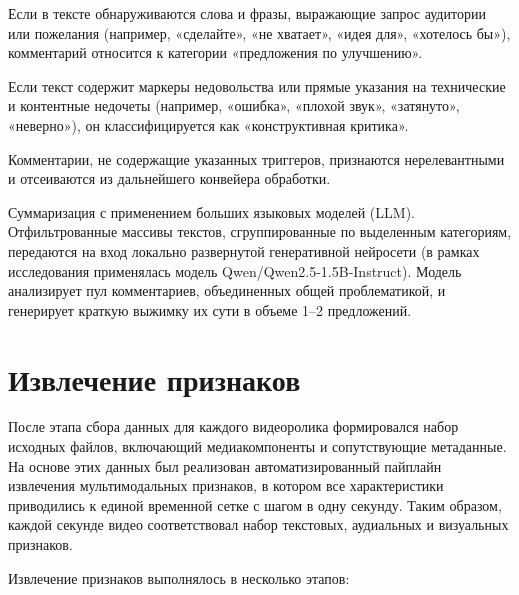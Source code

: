 \documentclass[times]{itmo-student-thesis}
\begin{document}
Если в тексте обнаруживаются слова и фразы, выражающие запрос аудитории или пожелания (например, «сделайте», «не хватает», «идея для», «хотелось бы»), комментарий относится к категории «предложения по улучшению».

Если текст содержит маркеры недовольства или прямые указания на технические и контентные недочеты (например, «ошибка», «плохой звук», «затянуто», «неверно»), он классифицируется как «конструктивная критика».

Комментарии, не содержащие указанных триггеров, признаются нерелевантными и отсеиваются из дальнейшего конвейера обработки.

Суммаризация с применением больших языковых моделей (LLM). Отфильтрованные массивы текстов, сгруппированные по выделенным категориям, передаются на вход локально развернутой генеративной нейросети (в рамках исследования применялась модель Qwen/Qwen2.5-1.5B-Instruct). Модель анализирует пул комментариев, объединенных общей проблематикой, и генерирует краткую выжимку их сути в объеме 1–2 предложений.

\section{Извлечение признаков}

После этапа сбора данных для каждого видеоролика формировался набор исходных файлов, включающий медиакомпоненты и сопутствующие метаданные. На основе этих данных был реализован автоматизированный пайплайн извлечения мультимодальных признаков, в котором все характеристики приводились к единой временной сетке с шагом в одну секунду. Таким образом, каждой секунде видео соответствовал набор текстовых, аудиальных и визуальных признаков.

Извлечение признаков выполнялось в несколько этапов:
\end{document}
